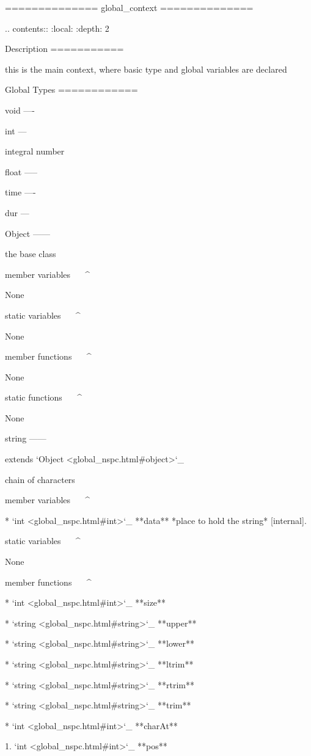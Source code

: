==============
global_context
==============


.. contents::
   :local:
   :depth: 2

Description
===========



this is the main context, where basic type and global variables are declared

Global Types
============

void
----

int
---

integral number

float
-----

time
----

dur
---

Object
------

the base class

member variables
^^^^^^^^^^^^^^^^

	None

static variables
^^^^^^^^^^^^^^^^

	None

member functions
^^^^^^^^^^^^^^^^


	None

static functions
^^^^^^^^^^^^^^^^


	None

string
------

extends `Object <global_nspc.html#object>`_ 

chain of characters

member variables
^^^^^^^^^^^^^^^^

	* `int <global_nspc.html#int>`_ **data** *place to hold the string*  [internal].


static variables
^^^^^^^^^^^^^^^^

	None

member functions
^^^^^^^^^^^^^^^^

	* `int <global_nspc.html#int>`_ **size**

	* `string <global_nspc.html#string>`_ **upper**

	* `string <global_nspc.html#string>`_ **lower**

	* `string <global_nspc.html#string>`_ **ltrim**

	* `string <global_nspc.html#string>`_ **rtrim**

	* `string <global_nspc.html#string>`_ **trim**

	* `int <global_nspc.html#int>`_ **charAt**

		1. `int <global_nspc.html#int>`_ **pos**

